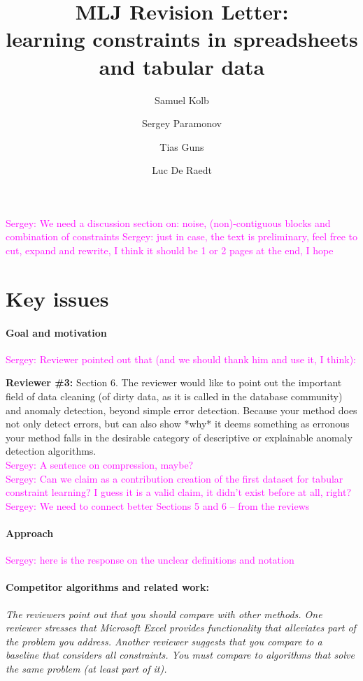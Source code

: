 \documentclass{article}
\author{Samuel Kolb \and Sergey Paramonov \and Tias Guns \and Luc {De Raedt}}
\title{MLJ Revision Letter:\\ learning constraints in spreadsheets and tabular data}
\newcommand{\sergey}[1]{\textcolor{magenta}{{\sc Sergey:} #1}\xspace}
\begin{document}
\maketitle
\sergey{We need a discussion section on: noise, (non)-contiguous blocks and combination of constraints} 
\sergey{just in case, the text is preliminary, feel free to cut, expand and rewrite, I think it should be 1 or 2 pages at the end, I hope}
\section{Key issues}

\paragraph{Goal and motivation}
\sergey{Reviewer pointed out that (and we should thank him and use it, I think):}

\textbf{Reviewer \#3:}
Section 6. The reviewer would like to point out the important field of data cleaning (of dirty data, as it is called in the database community) and anomaly detection, beyond simple error detection. Because your method does not only detect errors, but can also show *why* it deems something as erronous your method falls in the desirable category of descriptive or explainable anomaly detection algorithms.\\
\sergey{A sentence on compression, maybe?}\\
\sergey{Can we claim as a contribution creation of the first dataset for tabular constraint learning? I guess it is a valid claim, it didn't exist before at all, right?}\\
\sergey{We need to connect better Sections 5 and 6 -- from the reviews}

\paragraph{Approach}
\sergey{here is the response on the unclear definitions and notation}

\paragraph{Competitor algorithms and related work:} \textit{The reviewers point out that you should compare with other methods. One reviewer stresses that Microsoft Excel provides functionality that alleviates part of the problem you address. Another reviewer suggests that you compare to a baseline that considers all constraints. You must compare to algorithms that solve the same problem (at least part of it).}
\end{document}

